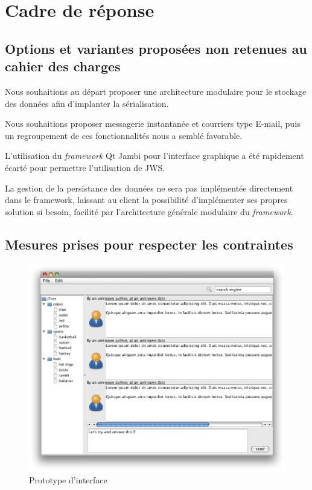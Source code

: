 \section{Cadre de réponse}

\subsection{Options et variantes proposées non retenues au cahier des charges}

Nous souhaitions au départ proposer une architecture modulaire pour le stockage des données afin d'implanter la sérialisation.

Nous souhaitions proposer messagerie instantanée et courriers type E-mail, puis un regroupement de ces fonctionnalités nous a semblé favorable.

L'utilisation du \emph{framework} Qt Jambi pour l'interface graphique a été rapidement écarté pour permettre l'utilisation de JWS.

La gestion de la persistance des données ne sera pas implémentée directement dans le framework, laissant au client la possibilité d'implémenter ses propres solution si besoin, facilité par l'architecture générale modulaire du \emph{framework}.
\subsection{Mesures prises pour respecter les contraintes}

\begin{figure}[thbp]
	\centering
		\includegraphics[width=15cm]{proto_client.png}
	\caption{Prototype d'interface}
	\label{fig:proto}
\end{figure}

